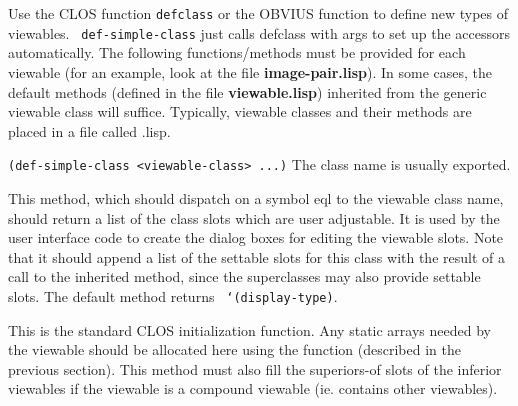 Use the CLOS function {\tt defclass} or the OBVIUS function
 to define new types of viewables.  {\tt
def-simple-class} just calls defclass with args to set up the
accessors automatically.  The following functions/methods must be
provided for each viewable (for an example, look at the file {\bf
image-pair.lisp}).  In some cases, the default methods (defined in the
file {\bf viewable.lisp}) inherited from the generic viewable class
will suffice.  Typically, viewable classes and their methods are
placed in a file called
.lisp.
\begin{description}

\item {\tt (def-simple-class <viewable-class> ...)}
The class name is usually exported.

\item{}
This method, which should dispatch on a symbol eql to the viewable
class name, should return a list of the class slots which are user
adjustable.  It is used by the user interface code to create the
dialog boxes for editing the viewable slots.  Note that it should
append a list of the settable slots for this class with the result of
a call to the inherited method, since the superclasses may also
provide settable slots.  The default method returns {\tt
`(display-type)}.

\item{}
This is the standard CLOS initialization function.  Any static arrays
needed by the viewable should be allocated here using the
 function (described in the previous section).
This method must also fill the superiors-of slots of the inferior
viewables if the viewable is a compound viewable (ie.  contains other
viewables).


\end{description}
